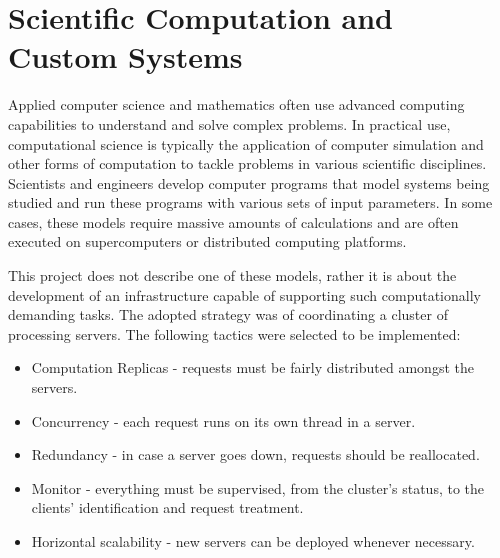 \documentclass[12pt]{article}
\begin{document}


\newpage
\section{Scientific Computation and Custom Systems} \label{scientificcomputation} %

Applied computer science and mathematics often use advanced computing capabilities to understand and solve complex problems.
In practical use, computational science is typically the application of computer simulation and other forms of computation to tackle problems in various 
scientific disciplines.
Scientists and engineers develop computer programs that model systems being studied and run these programs with various sets of input parameters.
In some cases, these models require massive amounts of calculations and are often executed on supercomputers or distributed computing platforms.

This project does not describe one of these models, rather it is about the development of an infrastructure capable of supporting such computationally demanding tasks.
The adopted strategy was of coordinating a cluster of processing servers.
The following tactics were selected to be implemented:
\vspace{-10pt}
\begin{itemize}[noitemsep]
  \item Computation Replicas - requests must be fairly distributed amongst the servers.
  \item Concurrency - each request runs on its own thread in a server.
  \item Redundancy - in case a server goes down, requests should be reallocated.
  \item Monitor - everything must be supervised, from the cluster's status, to the clients' identification and request treatment.
  \item Horizontal scalability - new servers can be deployed whenever necessary.
\end{itemize}
\vspace{-10pt}
\end{document}

